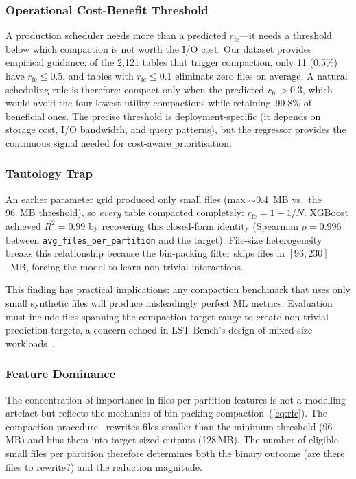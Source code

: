 \documentclass[conference, 10pt]{IEEEtran}
\begin{document}
\subsubsection{Operational Cost-Benefit Threshold}
A production scheduler needs more than a predicted $r_{\mathrm{fc}}$---it
needs a threshold below which compaction is not worth the I/O cost.
Our dataset provides empirical guidance: of the 2{,}121 tables that
trigger compaction, only 11 (0.5\%) have $r_{\mathrm{fc}} \leq 0.5$,
and tables with $r_{\mathrm{fc}} \leq 0.1$ eliminate zero files
on average. A natural scheduling rule is therefore: compact only
when the predicted $r_{\mathrm{fc}} > 0.3$, which would avoid the
four lowest-utility compactions while retaining~99.8\% of beneficial
ones. The precise threshold is deployment-specific (it depends on
storage cost, I/O bandwidth, and query patterns), but the regressor
provides the continuous signal needed for cost-aware prioritisation.

\subsubsection{Tautology Trap}
An earlier parameter grid produced only small files (max $\sim$0.4~MB vs.\ the
96~MB threshold), so \emph{every} table compacted completely:
$r_\mathrm{fc} = 1 - 1/N$. XGBoost achieved $R^2 = 0.99$ by recovering this
closed-form identity (Spearman $\rho = 0.996$ between
\texttt{avg\_files\_per\_partition} and the target). File-size heterogeneity
breaks this relationship because the bin-packing filter skips files in
$[96,230]$~MB, forcing the model to learn non-trivial interactions.

This finding has practical implications: any compaction benchmark that uses
only small synthetic files will produce misleadingly perfect ML metrics.
Evaluation must include files spanning the compaction target range to create
non-trivial prediction targets, a concern echoed in LST-Bench's design of
mixed-size workloads~\cite{camachorodriguez2024lstbench}.

\subsubsection{Feature Dominance}
The concentration of importance in files-per-partition features is not a
modelling artefact but reflects the mechanics of bin-packing
compaction~(\ref{eq:rfc}). The compaction procedure~\cite{iceberg_spec} rewrites files smaller
than the minimum threshold (96\,MB) and bins them into target-sized outputs
(128\,MB). The number of eligible small files per partition therefore
determines both the binary outcome (are there files to rewrite?) and the
reduction magnitude.
\end{document}
